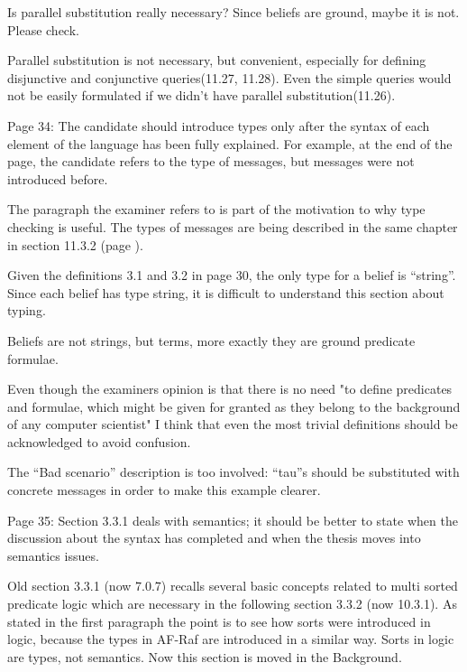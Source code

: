 \documentclass{article}
\newcommand{\todo}[1]{[\textcolor{red}{TODO}: #1]}
\newenvironment{them}{\noindent\begingroup\color{blue}}{\endgroup\par}
\begin{document}
\begin{them}

Is parallel substitution really necessary? Since beliefs are ground, maybe it
is not. Please check.

\end{them}
Parallel substitution is not necessary, but convenient, especially for defining
disjunctive and conjunctive queries(11.27, 11.28). Even the simple queries
would not be easily formulated if we didn't have parallel substitution(11.26).

\begin{them}

Page 34:
The candidate should introduce types only after the syntax of each element of
the language has been fully explained. For example, at the end of the page, the
candidate refers to the type of messages, but messages were not introduced
before.

\end{them}
The paragraph the examiner refers to is part of the motivation to why type
checking is useful. The types of messages are being described in the same
chapter in section 11.3.2 (page ).

\begin{them}

Given the definitions 3.1 and 3.2 in page 30, the only type for a belief is
“string”. Since each belief has type string, it is difficult to understand this
section about typing.

\end{them}
Beliefs are not strings, but terms, more exactly they are ground predicate
formulae.

Even though the examiners opinion is that there is no need "to define
predicates and formulae, which might be given for granted as they belong to the
background of any computer scientist" I think that even the most trivial
definitions should be acknowledged to avoid confusion. 

\begin{them}

The “Bad scenario” description is too involved: “tau”s should be substituted
with concrete messages in order to make this example clearer.

\end{them}
\todo{}

\begin{them}

Page 35:
Section 3.3.1 deals with semantics; it should be better to state when the
discussion about the syntax has completed and when the thesis moves into
semantics issues.

\end{them}
Old section 3.3.1 (now 7.0.7) recalls several basic concepts related to multi
sorted predicate logic which are necessary in the following section 3.3.2 (now
10.3.1). As stated in the first paragraph the point is to see how sorts were
introduced in logic, because the types in AF-Raf are introduced in a similar
way. Sorts in logic are types, not semantics. Now this section is moved in the
Background.
\end{document}
